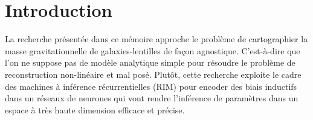 \chapter{Introduction}
\thispagestyle{empty}


La recherche présentée dans ce mémoire approche le problème de cartographier la 
masse gravitationnelle de galaxies-lentilles de façon agnostique. C'est-à-dire que 
l'on ne suppose pas de modèle analytique simple pour résoudre le problème 
de reconstruction non-linéaire et mal posé. Plutôt, cette recherche exploite 
le cadre des machines à inférence récurrentielles (RIM) pour encoder des biais 
inductifs dans un réseaux de neurones qui vont rendre l'inférence de 
paramètres dans un espace à très haute dimension efficace et précise.


